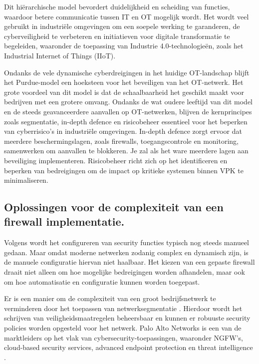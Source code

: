 Dit hiërarchische model bevordert duidelijkheid en scheiding van functies, waardoor betere communicatie tussen IT en OT mogelijk wordt. Het wordt veel gebruikt in industriële omgevingen om een soepele werking te garanderen, de cyberveiligheid te verbeteren en initiatieven voor digitale transformatie te begeleiden, waaronder de toepassing van Industrie 4.0-technologieën, zoals het Industrial Internet of Things (IIoT). \autocite{Commers2025}

Ondanks de vele dynamische cyberdreigingen in het huidige OT-landschap blijft het Purdue-model een hoeksteen voor het beveiligen van het OT-netwerk. Het grote voordeel van dit model is dat de schaalbaarheid het geschikt maakt voor bedrijven met een grotere omvang. Ondanks de wat oudere leeftijd van dit model en de steeds geavanceerdere aanvallen op OT-netwerken, blijven de kernprincipes zoals segmentatie, in-depth defence en risicobeheer essentieel voor het beperken van cyberrisico’s in industriële omgevingen. In-depth defence zorgt ervoor dat meerdere beschermingslagen, zoals firewalls, toegangscontrole en monitoring, samenwerken om aanvallen te blokkeren. Je zal als het ware meerdere lagen aan beveiliging implementeren. Risicobeheer richt zich op het identificeren en beperken van bedreigingen om de impact op kritieke systemen binnen VPK te minimaliseren.

\subsection{Oplossingen voor de complexiteit van een firewall implementatie.}

Volgens \textcite{Bringhenti2023} wordt het configureren van security functies typisch nog steeds manueel gedaan. Maar omdat moderne netwerken zodanig complex en dynamisch zijn, is de manuele configuratie hiervan niet haalbaar. Het kiezen van een gepaste firewall draait niet alleen om hoe mogelijke bedreigingen worden afhandelen, maar ook om hoe automatisatie en configuratie kunnen worden toegepast.

Er is een manier om de complexiteit van een groot bedrijfsnetwerk te verminderen door het toepassen van netwerksegmentatie \autocite{Bringhenti2023}. Hierdoor wordt het schrijven van veiligheidsmaatregelen beheersbaar en kunnen er robuuste security policies worden opgesteld voor het netwerk. Palo Alto Networks is een van de marktleiders op het vlak van cybersecurity-toepassingen, waaronder NGFW’s, cloud-based security services, advanced endpoint protection en threat intelligence \autocite{TechnicalWhitepaper2014}.

